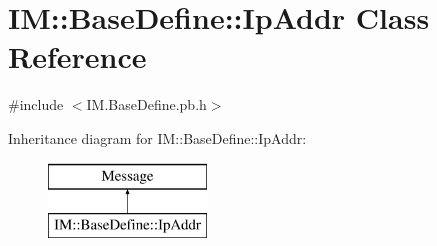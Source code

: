 \hypertarget{class_i_m_1_1_base_define_1_1_ip_addr}{}\section{I\+M\+:\+:Base\+Define\+:\+:Ip\+Addr Class Reference}
\label{class_i_m_1_1_base_define_1_1_ip_addr}


{\ttfamily \#include $<$I\+M.\+Base\+Define.\+pb.\+h$>$}

Inheritance diagram for I\+M\+:\+:Base\+Define\+:\+:Ip\+Addr\+:\begin{figure}[H]
\begin{center}
\leavevmode
\includegraphics[height=2.000000cm]{class_i_m_1_1_base_define_1_1_ip_addr}
\end{center}
\end{figure}
